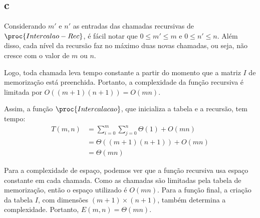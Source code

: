 \newpage

\subsection{c}

Considerando $m'$ e $n'$ as entradas das chamadas recursivas de $\proc{Intercalao-Rec}$, é fácil notar que $0 \leq m' \leq m$ e $0 \leq n' \leq n$. Além disso, cada nível da recursão faz no máximo duas novas chamadas, ou seja, não cresce com o valor de $m$ ou $n$.

Logo, toda chamada leva tempo constante a partir do momento que a matriz $I$ de memorização está preenchida. Portanto, a complexidade da função recursiva é limitada por $O\left((m + 1) (n + 1)\right) = O(m n)$.

Assim, a função $\proc{Intercalacao}$, que inicializa a tabela e a recursão, tem tempo:
\begin{align*}
    T(m, n) &= \sum_{i = 0}^m \sum_{j = 0}^n \Theta(1) + O(m n) \\
        &= \Theta((m + 1) (n + 1)) + O(m n) \\
        &= \Theta(m n)
\end{align*}

Para a complexidade de espaço, podemos ver que a função recursiva usa espaço constante em cada chamada. Como as chamadas são limitadas pela tabela de memorização, então o espaço utilizado é $O(m n)$. Para a função final, a criação da tabela $I$, com dimensões $(m + 1) \times (n + 1)$, também determina a complexidade. Portanto, $E(m, n) = \Theta(m n)$.
